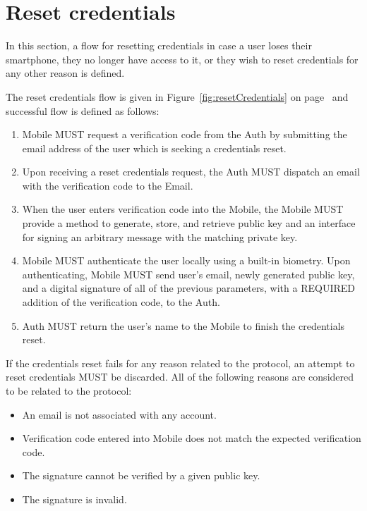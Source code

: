 \section{Reset credentials}
In this section, a flow for resetting credentials in case a user loses their smartphone, they no longer have access to it,
or they wish to reset credentials for any other reason is defined.
\medskip

The reset credentials flow is given in Figure~\ref{fig:resetCredentials} on page~\pageref{fig:resetCredentials} 
and successful flow is defined as follows:
    \begin{enumerate}
        \item Mobile MUST request a verification code from the Auth by submitting the email address of the user
              which is seeking a credentials reset.
        \item Upon receiving a reset credentials request, the Auth MUST dispatch an email with the verification
              code to the Email.
        \item When the user enters verification code into the Mobile, the Mobile MUST provide a method to generate,
              store, and retrieve public key and an interface for signing an arbitrary message with the matching 
              private key.
        \item Mobile MUST authenticate the user locally using a built-in biometry. Upon authenticating, Mobile 
              MUST send user's email, newly generated public key, and a digital signature of all of the previous 
              parameters, with a REQUIRED addition of the verification code, to the Auth.
        \item Auth MUST return the user's name to the Mobile to finish the credentials reset.
    \end{enumerate}
    
If the credentials reset fails for any reason related to the protocol, an attempt to reset credentials MUST 
be discarded. All of the following reasons are considered to be related to the protocol:
    \begin{itemize}
        \item An email is not associated with any account.
        \item Verification code entered into Mobile does not match the expected verification code.
        \item The signature cannot be verified by a given public key.
        \item The signature is invalid.
    \end{itemize}
